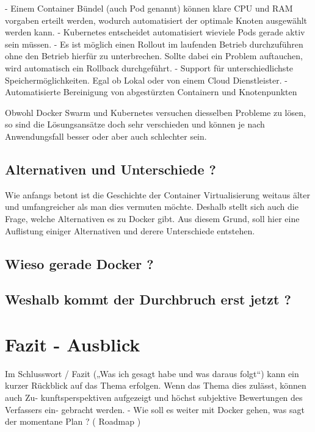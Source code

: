 \documentclass[12pt,toc=bib,toc=listof]{scrreprt}
\begin{document}
- Einem Container Bündel (auch Pod genannt) können klare CPU und RAM vorgaben erteilt werden, wodurch automatisiert der optimale Knoten ausgewählt werden kann.
- Kubernetes entscheidet automatisiert wieviele Pods gerade aktiv sein müssen.
- Es ist möglich einen Rollout im laufenden Betrieb durchzuführen ohne den Betrieb hierfür zu unterbrechen. Sollte dabei ein Problem auftauchen, wird automatisch ein Rollback durchgeführt.
- Support für unterschiedlichste Speichermöglichkeiten. Egal ob Lokal oder von einem Cloud Dienstleister.
- Automatisierte Bereinigung von abgestürzten Containern und Knotenpunkten

Obwohl Docker Swarm und Kubernetes versuchen diesselben Probleme zu lösen, so sind die Lösungsansätze doch sehr verschieden und können je nach Anwendungsfall besser oder aber auch schlechter sein.

\section{Alternativen und Unterschiede ?}
Wie anfangs betont ist die Geschichte der Container Virtualisierung weitaus älter und umfangreicher als man dies vermuten möchte.
Deshalb stellt sich auch die Frage, welche Alternativen es zu Docker gibt.
Aus diesem Grund, soll hier eine Auflistung einiger Alternativen und derere Unterschiede entstehen.






\section{Wieso gerade Docker ?}

\section{Weshalb kommt der Durchbruch erst jetzt ?}

\chapter{Fazit - Ausblick} %
\label{sec:fazit}
Im Schlusswort / Fazit („Was ich gesagt habe und was daraus folgt“) kann ein kurzer
Rückblick auf das Thema erfolgen. Wenn das Thema dies zulässt, können auch Zu-
kunftsperspektiven aufgezeigt und höchst subjektive Bewertungen des Verfassers ein-
gebracht werden.
- Wie soll es weiter mit Docker gehen, was sagt der momentane Plan ? ( Roadmap )
\end{document}
